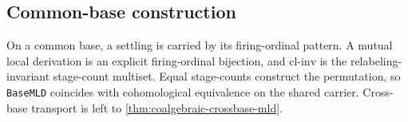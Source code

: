 \subsection{Common-base construction}

\begin{theorem}\label{thm:common-base-mld-classification}\leanok{}
On a common base, a settling is carried by its firing-ordinal pattern.  A mutual
local derivation is an explicit firing-ordinal bijection, and
\(\mathrm{cl\text{-}inv}\) is the relabeling-invariant stage-count multiset.
Equal stage-counts construct the permutation, so \texttt{BaseMLD} coincides with
cohomological equivalence on the shared carrier.  Cross-base transport is left
to \cref{thm:coalgebraic-crossbase-mld}.
\end{theorem}
